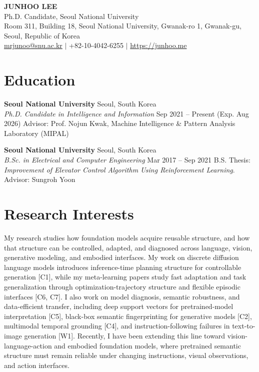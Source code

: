 \documentclass[10pt, letterpaper]{article}
\begin{document}
\begin{center}
    {\Huge \textbf{JUNHOO LEE}} \\ \vspace{2mm}
    Ph.D. Candidate, Seoul National University \\ \vspace{1mm}
    \small
    Room 311, Building 18, Seoul National University, Gwanak-ro 1, Gwanak-gu, Seoul, Republic of Korea \\
    \href{mailto:mrjunoo@snu.ac.kr}{mrjunoo@snu.ac.kr} $|$ +82-10-4042-6255 $|$ \href{https://junhoo.me}{https://junhoo.me}
\end{center}

\section{Education}
\textbf{Seoul National University} \hfill Seoul, South Korea \\
\textit{Ph.D. Candidate in Intelligence and Information} \hfill Sep 2021 -- Present (Exp. Aug 2026)
\newline
{\small Advisor: Prof. Nojun Kwak, Machine Intelligence \& Pattern Analysis Laboratory (MIPAL)}

\vspace{1mm}

\textbf{Seoul National University} \hfill Seoul, South Korea \\
\textit{B.Sc. in Electrical and Computer Engineering} \hfill Mar 2017 -- Sep 2021
\newline
{\small B.S. Thesis: \textit{Improvement of Elevator Control Algorithm Using Reinforcement Learning}. Advisor: Sungroh Yoon}

\section{Research Interests}
{\normalsize
My research studies how foundation models acquire reusable structure, and how
that structure can be controlled, adapted, and diagnosed across language, vision,
generative modeling, and embodied interfaces. My work on discrete diffusion
language models introduces inference-time planning structure for controllable
generation [C1], while my meta-learning papers study fast adaptation and task
generalization through optimization-trajectory structure and flexible episodic
interfaces [C6, C7]. I also work on model diagnosis, semantic robustness, and
data-efficient transfer, including deep support vectors for pretrained-model
interpretation [C5], black-box semantic fingerprinting for generative models
[C2], multimodal temporal grounding [C4], and instruction-following failures in
text-to-image generation [W1]. Recently, I have been extending this line toward
vision-language-action and embodied foundation models, where pretrained semantic
structure must remain reliable under changing instructions, visual observations,
and action interfaces.
}
\end{document}
